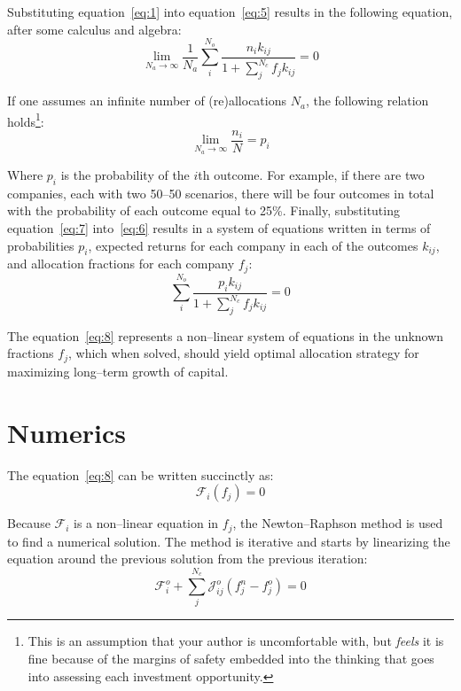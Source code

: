 \documentclass{article}
\begin{document}
\noindent Substituting equation~\eqref{eq:1} into equation~\eqref{eq:5} results
in the following equation, after some calculus and algebra:
\begin{equation}
\label{eq:6}
    \lim_{N_a \to \infty} \frac{1}{N_a}
    \sum_{i}^{N_o} \frac{n_i k_{ij}}{1 + \sum_{j}^{N_c} f_j k_{ij}} = 0
\end{equation}

\noindent If one assumes an infinite number of (re)allocations $N_a$,
the following relation holds\footnote{This is an assumption that your author is
uncomfortable with, but \textit{feels} it is fine because of the margins of
safety embedded into the thinking that goes into assessing each investment
opportunity.}:
\begin{equation}
\label{eq:7}
    \lim_{N_a \to \infty} \frac{n_i}{N} = p_i
\end{equation}

\noindent Where $p_i$ is the probability of the $i$th outcome. For example, if
there are two companies, each with two 50--50 scenarios, there will be four
outcomes in total with the probability of each outcome equal to 25\%. Finally,
substituting equation~\eqref{eq:7} into~\eqref{eq:6} results in a system of
equations written in terms of probabilities $p_i$, expected returns for each
company in each of the outcomes $k_{ij}$, and allocation fractions for each
company $f_j$:
\begin{equation}
\label{eq:8}
    \sum_{i}^{N_o} \frac{p_i k_{ij}}{1 + \sum_{j}^{N_c} f_j k_{ij}} = 0
\end{equation}

\noindent The equation~\eqref{eq:8} represents a non--linear system of equations
in the unknown fractions $f_j$, which when solved, should yield optimal
allocation strategy for maximizing long--term growth of capital.

\section{Numerics}
\label{sec:numerics}

\noindent The equation~\eqref{eq:8} can be written succinctly as:
\begin{equation}
\label{eq:9}
    \mathcal{F}_i(f_j) = 0
\end{equation}

\noindent Because $\mathcal{F}_i$ is a non--linear equation in $f_j$,
the Newton--Raphson method is used to find a numerical solution. The method is
iterative and starts by linearizing the equation around the previous solution
from the previous iteration:
\begin{equation}
\label{eq:10}
    \mathcal{F}_i^o + \sum_{j}^{N_c} \mathcal{J}_{ij}^o (f_j^n - f_j^o) = 0
\end{equation}
\end{document}
